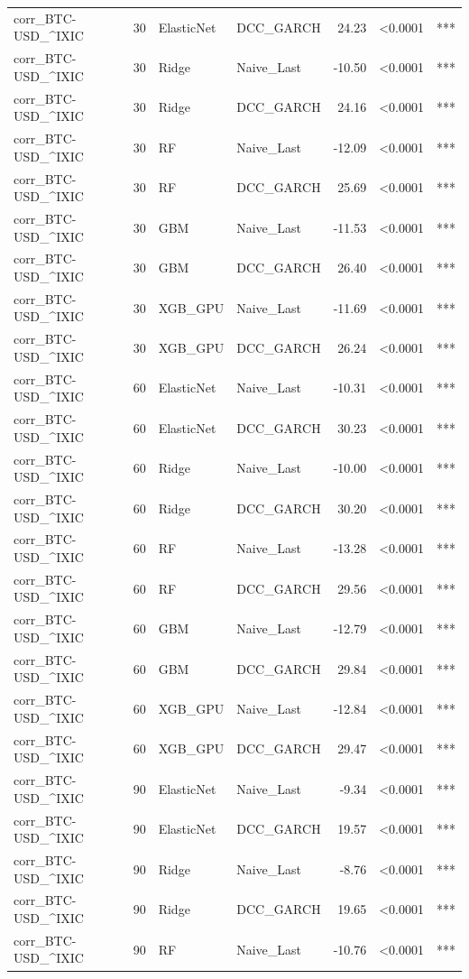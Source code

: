 \begin{table}[H]
\begin{tabular}{llllrrl}
corr_BTC-USD_^IXIC & 30 & ElasticNet & DCC_GARCH & 24.23 & <0.0001 & *** \\
corr_BTC-USD_^IXIC & 30 & Ridge & Naive_Last & -10.50 & <0.0001 & *** \\
corr_BTC-USD_^IXIC & 30 & Ridge & DCC_GARCH & 24.16 & <0.0001 & *** \\
corr_BTC-USD_^IXIC & 30 & RF & Naive_Last & -12.09 & <0.0001 & *** \\
corr_BTC-USD_^IXIC & 30 & RF & DCC_GARCH & 25.69 & <0.0001 & *** \\
corr_BTC-USD_^IXIC & 30 & GBM & Naive_Last & -11.53 & <0.0001 & *** \\
corr_BTC-USD_^IXIC & 30 & GBM & DCC_GARCH & 26.40 & <0.0001 & *** \\
corr_BTC-USD_^IXIC & 30 & XGB_GPU & Naive_Last & -11.69 & <0.0001 & *** \\
corr_BTC-USD_^IXIC & 30 & XGB_GPU & DCC_GARCH & 26.24 & <0.0001 & *** \\
corr_BTC-USD_^IXIC & 60 & ElasticNet & Naive_Last & -10.31 & <0.0001 & *** \\
corr_BTC-USD_^IXIC & 60 & ElasticNet & DCC_GARCH & 30.23 & <0.0001 & *** \\
corr_BTC-USD_^IXIC & 60 & Ridge & Naive_Last & -10.00 & <0.0001 & *** \\
corr_BTC-USD_^IXIC & 60 & Ridge & DCC_GARCH & 30.20 & <0.0001 & *** \\
corr_BTC-USD_^IXIC & 60 & RF & Naive_Last & -13.28 & <0.0001 & *** \\
corr_BTC-USD_^IXIC & 60 & RF & DCC_GARCH & 29.56 & <0.0001 & *** \\
corr_BTC-USD_^IXIC & 60 & GBM & Naive_Last & -12.79 & <0.0001 & *** \\
corr_BTC-USD_^IXIC & 60 & GBM & DCC_GARCH & 29.84 & <0.0001 & *** \\
corr_BTC-USD_^IXIC & 60 & XGB_GPU & Naive_Last & -12.84 & <0.0001 & *** \\
corr_BTC-USD_^IXIC & 60 & XGB_GPU & DCC_GARCH & 29.47 & <0.0001 & *** \\
corr_BTC-USD_^IXIC & 90 & ElasticNet & Naive_Last & -9.34 & <0.0001 & *** \\
corr_BTC-USD_^IXIC & 90 & ElasticNet & DCC_GARCH & 19.57 & <0.0001 & *** \\
corr_BTC-USD_^IXIC & 90 & Ridge & Naive_Last & -8.76 & <0.0001 & *** \\
corr_BTC-USD_^IXIC & 90 & Ridge & DCC_GARCH & 19.65 & <0.0001 & *** \\
corr_BTC-USD_^IXIC & 90 & RF & Naive_Last & -10.76 & <0.0001 & *** \\

\end{tabular}
\end{table}
